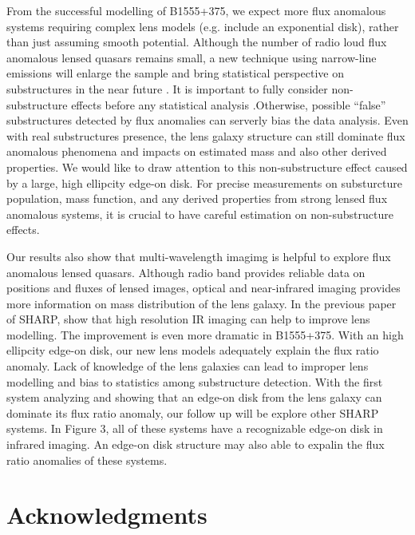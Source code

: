 \documentclass[useAMS,usenatbib]{mn2e}
\begin{document}
From the successful modelling of B1555+375,  we expect more flux anomalous systems requiring complex lens models (e.g. include an exponential disk), rather than just assuming smooth potential. Although the number of radio loud flux anomalous lensed quasars remains small, a new technique using narrow-line emissions will enlarge the sample and bring statistical perspective on substructures in the near future \citep{N14}. It is important to fully consider non-substructure effects before any statistical analysis .Otherwise, possible ``false'' substructures detected by flux anomalies can serverly bias the data analysis. Even with real substructures presence, the lens galaxy structure can still dominate flux anomalous phenomena and impacts on estimated mass and also other derived properties. We would like to draw attention to this non-substructure effect caused by a large, high ellipcity edge-on disk. For precise measurements on substurcture population, mass function, and any derived properties from strong lensed flux anomalous systems, it is crucial to have careful estimation on non-substructure effects.

Our results also show that multi-wavelength imagimg is helpful to explore flux anomalous lensed quasars. Although radio band provides reliable data on positions and fluxes of lensed images, optical and near-infrared imaging provides more information on mass distribution of the lens galaxy. In the previous paper of SHARP, \citet{SHARP12} show that high resolution IR imaging can help to improve lens modelling. The improvement is even more dramatic in B1555+375. With an high ellipcity edge-on disk, our new lens models adequately explain the flux ratio anomaly. Lack of knowledge of the lens galaxies can lead to improper lens modelling and bias to statistics among substructure detection. With the first system analyzing and showing that an edge-on disk from the lens galaxy can dominate its flux ratio anomaly, our follow up will be explore other SHARP systems. In Figure 3, all of these systems have a recognizable edge-on disk in infrared imaging. An edge-on disk structure may also able to expalin the flux ratio anomalies of these systems.\\
 

\section*{Acknowledgments}







\label{lastpage}
\end{document}
